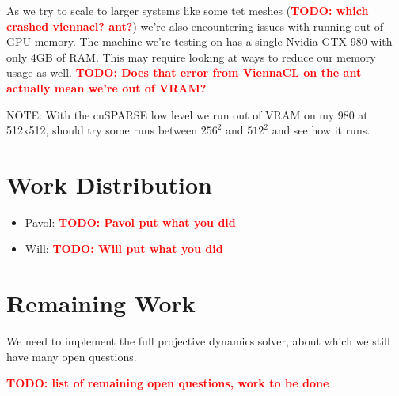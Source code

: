 \documentclass[11pt]{article}
\newcommand{\TODO}[1]{\textcolor{red}{\textbf{TODO: #1}}}
\begin{document}
As we try to scale to larger systems like some tet meshes (\TODO{which crashed viennacl? ant?}) we're
also encountering issues with running out of GPU memory. The machine we're testing on has a single
Nvidia GTX 980 with only 4GB of RAM. This may require looking at ways to reduce our memory usage
as well. \TODO{Does that error from ViennaCL on the ant actually mean we're out of VRAM?}

NOTE: With the cuSPARSE low level we run out of VRAM on my 980 at 512x512, should try some runs between
$256^2$ and $512^2$ and see how it runs.

\section{Work Distribution}

\begin{itemize}
	\item Pavol: \TODO{Pavol put what you did}
	\item Will: \TODO{Will put what you did}
\end{itemize}

\section{Remaining Work}

We need to implement the full projective dynamics solver, about which we still have many open
questions.

\TODO{list of remaining open questions, work to be done}
\end{document}
